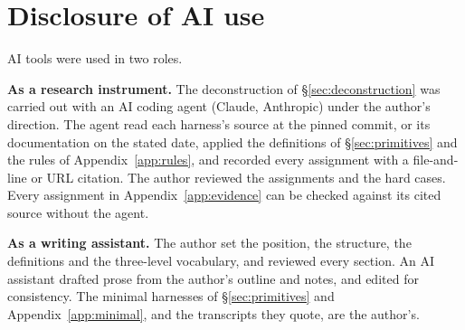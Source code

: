 \section*{Disclosure of AI use}

AI tools were used in two roles.

\textbf{As a research instrument.} The deconstruction of \S\ref{sec:deconstruction} was carried out with an AI coding agent (Claude, Anthropic) under the author's direction. The agent read each harness's source at the pinned commit, or its documentation on the stated date, applied the definitions of \S\ref{sec:primitives} and the rules of Appendix~\ref{app:rules}, and recorded every assignment with a file-and-line or URL citation. The author reviewed the assignments and the hard cases. Every assignment in Appendix~\ref{app:evidence} can be checked against its cited source without the agent.

\textbf{As a writing assistant.} The author set the position, the structure, the definitions and the three-level vocabulary, and reviewed every section. An AI assistant drafted prose from the author's outline and notes, and edited for consistency. The minimal harnesses of \S\ref{sec:primitives} and Appendix~\ref{app:minimal}, and the transcripts they quote, are the author's.

